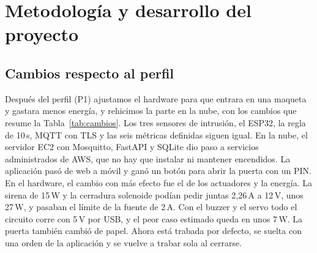 \documentclass[manuscript,screen,nonacm]{acmart}
\begin{document}
\section{Metodología y desarrollo del proyecto}
\label{sec:metodologia}

\subsection{Cambios respecto al perfil}
Después del perfil (P1) ajustamos el hardware para que entrara en una maqueta y gastara menos energía, y rehicimos la parte en la nube, con los cambios que resume la Tabla~\ref{tab:cambios}. Los tres sensores de intrusión, el ESP32, la regla de 10\,s, MQTT con TLS y las seis métricas definidas siguen igual. En la nube, el servidor EC2 con Mosquitto, FastAPI y SQLite dio paso a servicios administrados de AWS, que no hay que instalar ni mantener encendidos. La aplicación pasó de web a móvil y ganó un botón para abrir la puerta con un PIN. En el hardware, el cambio con más efecto fue el de los actuadores y la energía. La sirena de 15\,W y la cerradura solenoide podían pedir juntas 2,26\,A a 12\,V, unos 27\,W, y pasaban el límite de la fuente de 2\,A. Con el buzzer y el servo todo el circuito corre con 5\,V por USB, y el peor caso estimado queda en unos 7\,W. La puerta también cambió de papel. Ahora está trabada por defecto, se suelta con una orden de la aplicación y se vuelve a trabar sola al cerrarse.
\end{document}
